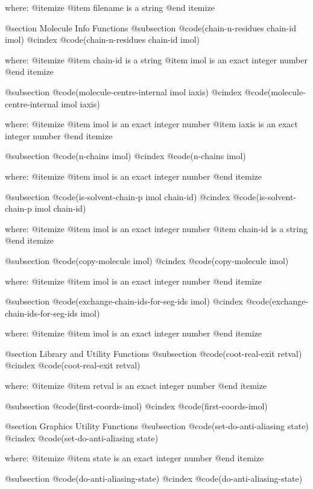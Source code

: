 where: 
 @itemize 
     @item filename is a string
 @end itemize



@section Molecule Info Functions 
@subsection @code{(chain-n-residues chain-id imol)}
@cindex @code{(chain-n-residues chain-id imol)}
 
where: 
 @itemize 
     @item chain-id is a string
     @item imol is an exact integer number
 @end itemize


@subsection @code{(molecule-centre-internal imol iaxis)}
@cindex @code{(molecule-centre-internal imol iaxis)}
 
where: 
 @itemize 
     @item imol is an exact integer number
     @item iaxis is an exact integer number
 @end itemize


@subsection @code{(n-chains imol)}
@cindex @code{(n-chains imol)}
 
where: 
 @itemize 
     @item imol is an exact integer number
 @end itemize


@subsection @code{(is-solvent-chain-p imol chain-id)}
@cindex @code{(is-solvent-chain-p imol chain-id)}
 
where: 
 @itemize 
     @item imol is an exact integer number
     @item chain-id is a string
 @end itemize


@subsection @code{(copy-molecule imol)}
@cindex @code{(copy-molecule imol)}
 
where: 
 @itemize 
     @item imol is an exact integer number
 @end itemize


@subsection @code{(exchange-chain-ids-for-seg-ids imol)}
@cindex @code{(exchange-chain-ids-for-seg-ids imol)}
 
where: 
 @itemize 
     @item imol is an exact integer number
 @end itemize



@section Library and Utility Functions 
@subsection @code{(coot-real-exit retval)}
@cindex @code{(coot-real-exit retval)}
 
where: 
 @itemize 
     @item retval is an exact integer number
 @end itemize


@subsection @code{(first-coords-imol)}
@cindex @code{(first-coords-imol)}
 

@section Graphics Utility Functions 
@subsection @code{(set-do-anti-aliasing state)}
@cindex @code{(set-do-anti-aliasing state)}
 
where: 
 @itemize 
     @item state is an exact integer number
 @end itemize


@subsection @code{(do-anti-aliasing-state)}
@cindex @code{(do-anti-aliasing-state)}
 
